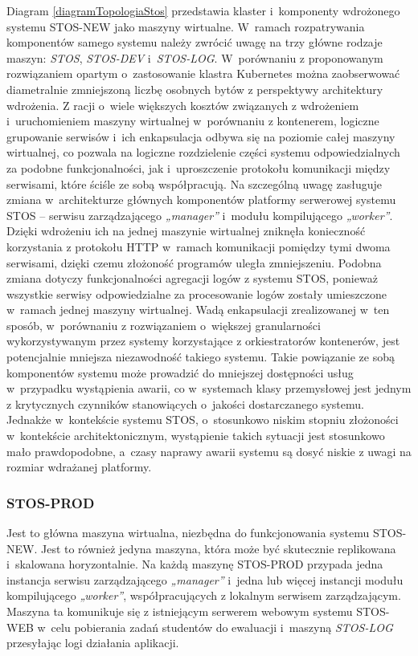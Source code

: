 \noindent Diagram \ref{diagramTopologiaStos} przedstawia klaster i~komponenty wdrożonego systemu STOS-NEW jako maszyny wirtualne. W~ramach rozpatrywania komponentów samego systemu należy zwrócić uwagę na trzy główne rodzaje maszyn: \textit{STOS}, \textit{STOS-DEV} i~\textit{STOS-LOG}. W~porównaniu z proponowanym rozwiązaniem opartym o~zastosowanie klastra Kubernetes można zaobserwować diametralnie zmniejszoną liczbę osobnych bytów z perspektywy architektury wdrożenia. Z racji o~wiele większych kosztów związanych z wdrożeniem i~uruchomieniem maszyny wirtualnej w~porównaniu z kontenerem, logiczne grupowanie serwisów i~ich enkapsulacja odbywa się na poziomie całej maszyny wirtualnej, co pozwala na logiczne rozdzielenie części systemu odpowiedzialnych za podobne funkcjonalności, jak i~uproszczenie protokołu komunikacji między serwisami, które ściśle ze sobą współpracują. Na szczególną uwagę zasługuje zmiana w~architekturze głównych komponentów platformy serwerowej systemu STOS -- serwisu zarządzającego \textit{„manager”} i~modułu kompilującego \textit{„worker”}. Dzięki wdrożeniu ich na jednej maszynie wirtualnej zniknęła konieczność korzystania z protokołu HTTP w~ramach komunikacji pomiędzy tymi dwoma serwisami, dzięki czemu złożoność programów uległa zmniejszeniu. Podobna zmiana dotyczy funkcjonalności agregacji logów z systemu STOS, ponieważ wszystkie serwisy odpowiedzialne za procesowanie logów zostały umieszczone w~ramach jednej maszyny wirtualnej.
\noindent Wadą enkapsulacji zrealizowanej w~ten sposób, w~porównaniu z rozwiązaniem o~większej granularności wykorzystywanym przez systemy korzystające z orkiestratorów kontenerów, jest potencjalnie mniejsza niezawodność takiego systemu. Takie powiązanie ze sobą komponentów systemu może prowadzić do mniejszej dostępności usług w~przypadku wystąpienia awarii, co w~systemach klasy przemysłowej jest jednym z krytycznych czynników stanowiących o~jakości dostarczanego systemu. Jednakże w~kontekście systemu STOS, o~stosunkowo niskim stopniu złożoności w~kontekście architektonicznym, wystąpienie takich sytuacji jest stosunkowo mało prawdopodobne, a~czasy naprawy awarii systemu są dosyć niskie z uwagi na rozmiar wdrażanej platformy.

\subsubsection{STOS-PROD}
Jest to główna maszyna wirtualna, niezbędna do funkcjonowania systemu STOS-NEW. Jest to również jedyna maszyna, która może być skutecznie replikowana i~skalowana horyzontalnie. Na każdą maszynę STOS-PROD przypada jedna instancja serwisu zarządzającego \textit{„manager”} i~jedna lub więcej instancji modułu kompilującego \textit{„worker”}, współpracujących z lokalnym serwisem zarządzającym. Maszyna ta komunikuje się z istniejącym serwerem webowym systemu STOS-WEB w~celu pobierania zadań studentów do ewaluacji i~maszyną \textit{STOS-LOG} przesyłając logi działania aplikacji.

